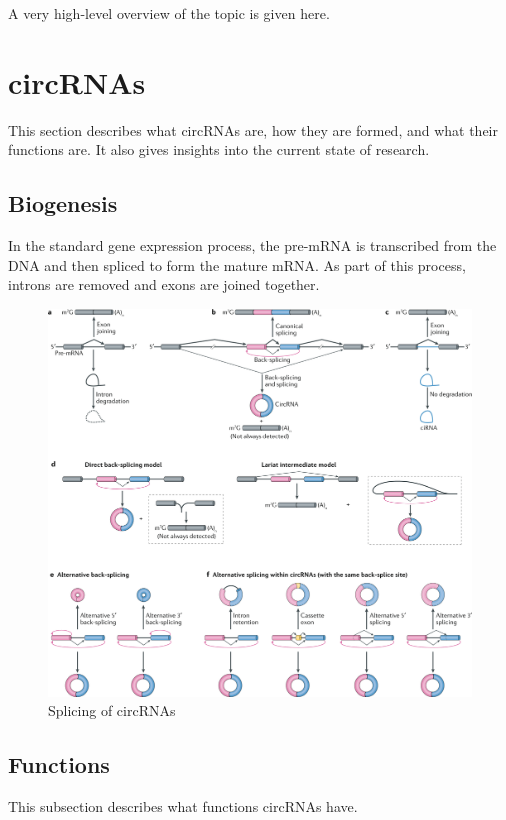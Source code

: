 A very high-level overview of the topic is given here.

\lipsum[1]

\section{circRNAs}
This section describes what circRNAs are, how they are formed, and what their functions are.
It also gives insights into the current state of research.

\subsection{Biogenesis}
In the standard gene expression process, the pre-mRNA is transcribed from the DNA and then spliced to form the mature mRNA.
As part of this process, introns are removed and exons are joined together. \cite{black_mechanisms_2003}

\begin{figure}[H]
    \centering
    \includegraphics[width=\textwidth]{chapters/background/figures/circRNA-splicing.png}
    \caption{Splicing of circRNAs}
    \label{fig:circRNA_splicing}
\end{figure}

\subsection{Functions}
This subsection describes what functions circRNAs have.

